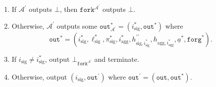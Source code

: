 \documentclass{iacrtrans}
\theoremstyle{definition}
\numberwithin{theorem}{subsection}
\numberwithin{lemma}{theorem}
\newcommand{\adversary}{\mathcal{A}}
\begin{document}
\begin{description}
\begin{enumerate}
\item If $\adversary^\prime$ outputs $\bot$, then $\texttt{fork}^{\adversary^\prime}$ outputs $\bot$. 

\item  Otherwise, $\adversary^\prime$ outputs some $\texttt{out}_{\adversary^\prime}^* = (i_{\text{sig}}^*, \texttt{out}^*)$ where \[\texttt{out}^* = (i_{\text{sig}}^*, \ell_{\text{sig}}^*, \pi_{\text{sig}}^*, i_{\text{agg}}^*, h_{\text{sig}, i_{\text{sig}}^*}^{\prime \prime}, h_{\text{agg}, i_{\text{agg}}^*}, \underline{a}^*, \texttt{forg}^*).\]


\item If $i_{\text{sig}} \neq i_{\text{sig}}^*$, output $\bot_{\texttt{fork}^{\adversary^\prime}}$ and terminate. 

\item Otherwise, output $(i_{\text{sig}}, \texttt{out}^{\prime})$ where $\texttt{out}^\prime = (\texttt{out}, \texttt{out}^*)$.
\end{enumerate}

\end{description}

\end{document}
